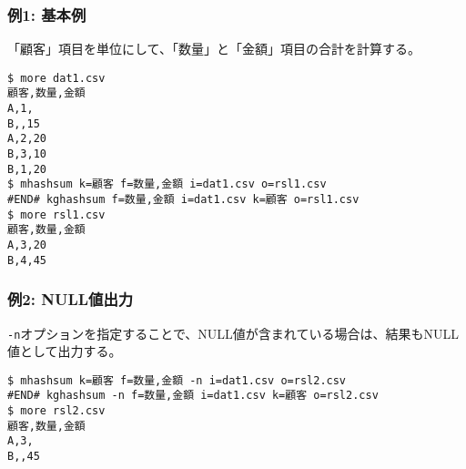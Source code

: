 \subsubsection*{例1: 基本例}

「顧客」項目を単位にして、「数量」と「金額」項目の合計を計算する。


\begin{Verbatim}[baselinestretch=0.7,frame=single]
$ more dat1.csv
顧客,数量,金額
A,1,
B,,15
A,2,20
B,3,10
B,1,20
$ mhashsum k=顧客 f=数量,金額 i=dat1.csv o=rsl1.csv
#END# kghashsum f=数量,金額 i=dat1.csv k=顧客 o=rsl1.csv
$ more rsl1.csv
顧客,数量,金額
A,3,20
B,4,45
\end{Verbatim}
\subsubsection*{例2: NULL値出力}

\verb|-n|オプションを指定することで、NULL値が含まれている場合は、結果もNULL値として出力する。


\begin{Verbatim}[baselinestretch=0.7,frame=single]
$ mhashsum k=顧客 f=数量,金額 -n i=dat1.csv o=rsl2.csv
#END# kghashsum -n f=数量,金額 i=dat1.csv k=顧客 o=rsl2.csv
$ more rsl2.csv
顧客,数量,金額
A,3,
B,,45
\end{Verbatim}
